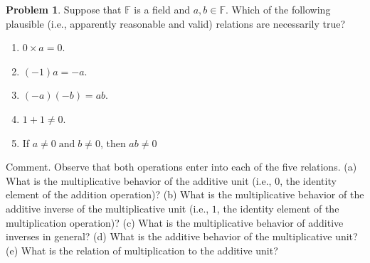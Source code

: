 \documentclass[english,notitlepage,smartquotes]{hgbreport}
\theoremstyle{definition}
\theoremstyle{definition}
\newtheorem{problem}{Problem}
\theoremstyle{remark}
\theoremstyle{definition}
\theoremstyle{plain}
\theoremstyle{definition}
\begin{document}
\begin{problem}
Suppose that $\mathbb{F}$ is a field and $a,b\in\mathbb{F}$. Which of the following plausible (i.e., apparently reasonable and valid) relations are necessarily true?

\begin{enumerate}[label=(\emph{\alph*})]
\item\label{item:xprop+} $0\times a=0$.
\item $(-1)a=-a$.
\item $(-a)(-b)=ab$.
\item $1+1\ne0$.
\item If $a\ne0\;\text{and}\;b\ne0$, then $ab\ne0$
\end{enumerate}
Comment. Observe that both operations enter into each of the five relations.  (a) What is the multiplicative behavior of the additive unit (i.e., $0$, the identity element of the addition operation)? (b) What is the multiplicative behavior of the additive inverse of the multiplicative unit (i.e., $1$, the identity element of the multiplication operation)? (c) What is the multiplicative behavior of additive inverses in general? (d) What is the additive behavior of the multiplicative unit? (e) What is the relation of multiplication to the additive unit?
\label{pr:fieldproblems}
\end{problem}
\end{document}
